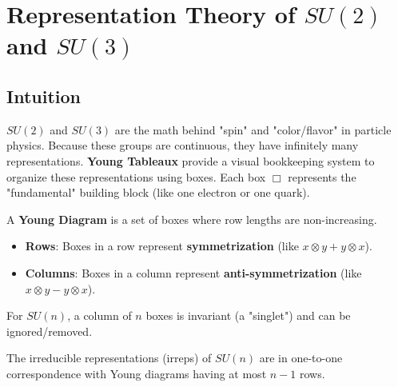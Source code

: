 \section{Representation Theory of $SU(2)$ and $SU(3)$}

\subsection{Intuition}
$SU(2)$ and $SU(3)$ are the math behind "spin" and "color/flavor" in particle physics. Because these groups are continuous, they have infinitely many representations. \textbf{Young Tableaux} provide a visual bookkeeping system to organize these representations using boxes. Each box $\Box$ represents the "fundamental" building block (like one electron or one quark).

\begin{definition}
A \textbf{Young Diagram} is a set of boxes where row lengths are non-increasing.
\begin{itemize}
    \item \textbf{Rows}: Boxes in a row represent \textbf{symmetrization} (like $x \otimes y + y \otimes x$).
    \item \textbf{Columns}: Boxes in a column represent \textbf{anti-symmetrization} (like $x \otimes y - y \otimes x$).
\end{itemize}
For $SU(n)$, a column of $n$ boxes is invariant (a "singlet") and can be ignored/removed.
\end{definition}

\begin{theorem}[Irreps of $SU(n)$]
The irreducible representations (irreps) of $SU(n)$ are in one-to-one correspondence with Young diagrams having at most $n-1$ rows.
\end{theorem}

